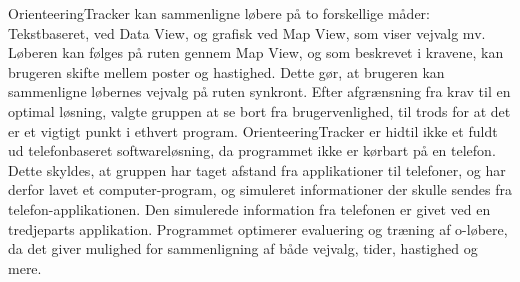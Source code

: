 OrienteeringTracker kan sammenligne løbere på to forskellige måder: Tekstbaseret, ved Data View, og grafisk ved Map View, som viser vejvalg mv. \newline
Løberen kan følges på ruten gennem Map View, og som beskrevet i kravene, kan brugeren skifte mellem poster og hastighed. Dette gør, at brugeren kan sammenligne løbernes vejvalg på ruten synkront.\newline
Efter afgrænsning fra krav til en optimal løsning, valgte gruppen at se bort fra brugervenlighed, til trods for at det er et vigtigt punkt i ethvert program.\newline
OrienteeringTracker er hidtil ikke et fuldt ud telefonbaseret softwareløsning, da programmet ikke er kørbart på en telefon. Dette skyldes, at gruppen har taget afstand fra applikationer til telefoner, og har derfor lavet et computer-program, og simuleret informationer der skulle sendes fra telefon-applikationen. Den simulerede information fra telefonen er givet ved en tredjeparts applikation.\newline
Programmet optimerer evaluering og træning af o-løbere, da det giver mulighed for sammenligning af både vejvalg, tider, hastighed og mere.




